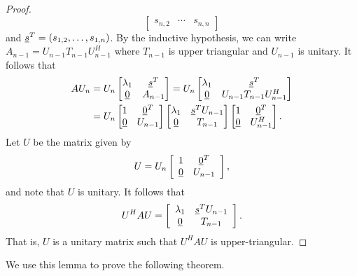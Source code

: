 \begin{proof}
\begin{equation*}
\begin{bmatrix}
s_{n,2} & \cdots & s_{n,n} \end{bmatrix}
\end{equation*}
and $\underline{s}^T = (s_{1,2}, \ldots, s_{1,n})$.
By the inductive hypothesis, we can write $A_{n-1} = U_{n-1} T_{n-1} U_{n-1}^H$ where $T_{n-1}$ is upper triangular and $U_{n-1}$ is unitary.
It follows that
\begin{equation*}
\begin{split}
A U_n &= U_n \begin{bmatrix} \lambda_1 & \underline{s}^T \\
\underline{0} & A_{n-1} \end{bmatrix}
= U_n \begin{bmatrix} \lambda_1 & \underline{s}^T \\
\underline{0} & U_{n-1} T_{n-1} U_{n-1}^H \end{bmatrix} \\
&= U_n \begin{bmatrix} 1 & \underline{0}^T \\
\underline{0} & U_{n-1} \end{bmatrix}
\begin{bmatrix} \lambda_1 & \underline{s}^T U_{n-1} \\
\underline{0} & T_{n-1} \end{bmatrix}
\begin{bmatrix} 1 & \underline{0}^T \\
\underline{0} & U_{n-1}^H \end{bmatrix} .
\end{split}
\end{equation*}
Let $U$ be the matrix given by
\begin{equation*}
U = U_n \left[ \begin{array}{cc} 1 & \underline{0}^T \\
\underline{0} & U_{n-1} \end{array} \right] ,
\end{equation*}
and note that $U$ is unitary.
It follows that
\begin{equation*}
U^H A U = 
\left[ \begin{array}{cc} \lambda_1 & \underline{s}^T U_{n-1} \\
\underline{0} & T_{n-1} \end{array} \right] .
\end{equation*}
That is, $U$ is a unitary matrix such that $U^H A U$ is upper-triangular.
\end{proof}

We use this lemma to prove the following theorem.

